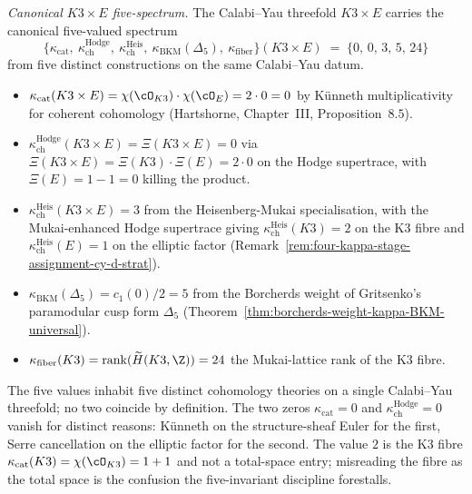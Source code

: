 \emph{Canonical $K3 \times E$ five-spectrum.} The Calabi--Yau
threefold $K3 \times E$ carries the canonical five-valued spectrum
\[
 \bigl\{
 \kappa_{\mathrm{cat}},\
 \kappa_{\mathrm{ch}}^{\mathrm{Hodge}},\
 \kappa_{\mathrm{ch}}^{\mathrm{Heis}},\
 \kappa_{\mathrm{BKM}}(\Delta_5),\
 \kappa_{\mathrm{fiber}}
 \bigr\}(K3 \times E)
 \;=\; \{0,\, 0,\, 3,\, 5,\, 24\}
\]
from five distinct constructions on the same Calabi--Yau datum.
\begin{itemize}[leftmargin=1.8em,itemsep=1pt]
\item $\kappa_{\mathrm{cat}}(K3 \times E) = \chi(\cO_{K3}) \cdot
\chi(\cO_E) = 2 \cdot 0 = 0$ by K\"unneth multiplicativity for
coherent cohomology (Hartshorne, Chapter~III, Proposition~$8.5$).
\item $\kappa_{\mathrm{ch}}^{\mathrm{Hodge}}(K3 \times E) =
\Xi(K3 \times E) = 0$ via
$\Xi(K3 \times E) = \Xi(K3) \cdot \Xi(E) = 2 \cdot 0$ on the
Hodge supertrace, with $\Xi(E) = 1 - 1 = 0$ killing the product.
\item $\kappa_{\mathrm{ch}}^{\mathrm{Heis}}(K3 \times E) = 3$
from the Heisenberg-Mukai specialisation, with the Mukai-enhanced
Hodge supertrace giving
$\kappa_{\mathrm{ch}}^{\mathrm{Heis}}(K3) = 2$ on the K3 fibre and
$\kappa_{\mathrm{ch}}^{\mathrm{Heis}}(E) = 1$ on the elliptic
factor (Remark~\ref{rem:four-kappa-stage-assignment-cy-d-strat}).
\item $\kappa_{\mathrm{BKM}}(\Delta_5) = c_1(0)/2 = 5$ from
the Borcherds weight of Gritsenko's paramodular cusp form
$\Delta_5$
(Theorem~\ref{thm:borcherds-weight-kappa-BKM-universal}).
\item $\kappa_{\mathrm{fiber}}(K3) = \mathrm{rank}(\widetilde H(K3,
\Z)) = 24$ the Mukai-lattice rank of the K3 fibre.
\end{itemize}
The five values inhabit five distinct cohomology theories on a
single Calabi--Yau threefold; no two coincide by definition. The
two zeros $\kappa_{\mathrm{cat}} = 0$ and
$\kappa_{\mathrm{ch}}^{\mathrm{Hodge}} = 0$ vanish for distinct
reasons: K\"unneth on the structure-sheaf Euler for the first,
Serre cancellation on the elliptic factor for the second.
The value $2$ is the K3 fibre $\kappa_{\mathrm{cat}}(K3) =
\chi(\cO_{K3}) = 1 + 1$ and not a total-space entry; misreading
the fibre as the total space is the confusion the five-invariant
discipline forestalls.

